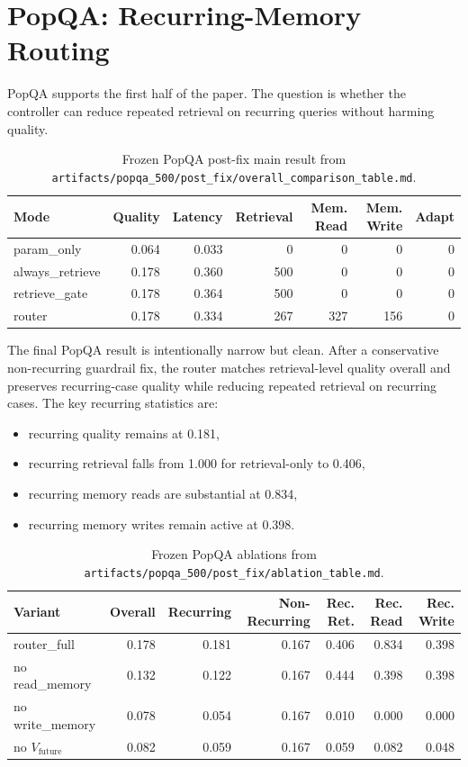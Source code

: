 \section{PopQA: Recurring-Memory Routing}

PopQA supports the first half of the paper. The question is whether the controller can reduce repeated retrieval on recurring queries without harming quality.

\begin{table}[t]
\centering
\small
\begin{tabular}{lrrrrrr}
\toprule
Mode & Quality & Latency & Retrieval & Mem. Read & Mem. Write & Adapt \\
\midrule
param\_only & 0.064 & 0.033 & 0 & 0 & 0 & 0 \\
always\_retrieve & 0.178 & 0.360 & 500 & 0 & 0 & 0 \\
retrieve\_gate & 0.178 & 0.364 & 500 & 0 & 0 & 0 \\
router & 0.178 & 0.334 & 267 & 327 & 156 & 0 \\
\bottomrule
\end{tabular}
\caption{Frozen PopQA post-fix main result from \texttt{artifacts/popqa\_500/post\_fix/overall\_comparison\_table.md}.}
\end{table}

The final PopQA result is intentionally narrow but clean. After a conservative non-recurring guardrail fix, the router matches retrieval-level quality overall and preserves recurring-case quality while reducing repeated retrieval on recurring cases. The key recurring statistics are:
\begin{itemize}[leftmargin=1.5em]
\item recurring quality remains at 0.181,
\item recurring retrieval falls from 1.000 for retrieval-only to 0.406,
\item recurring memory reads are substantial at 0.834,
\item recurring memory writes remain active at 0.398.
\end{itemize}

\begin{table}[t]
\centering
\small
\begin{tabular}{lrrrrrr}
\toprule
Variant & Overall & Recurring & Non-Recurring & Rec. Ret. & Rec. Read & Rec. Write \\
\midrule
router\_full & 0.178 & 0.181 & 0.167 & 0.406 & 0.834 & 0.398 \\
no read\_memory & 0.132 & 0.122 & 0.167 & 0.444 & 0.398 & 0.398 \\
no write\_memory & 0.078 & 0.054 & 0.167 & 0.010 & 0.000 & 0.000 \\
no $V_{\text{future}}$ & 0.082 & 0.059 & 0.167 & 0.059 & 0.082 & 0.048 \\
\bottomrule
\end{tabular}
\caption{Frozen PopQA ablations from \texttt{artifacts/popqa\_500/post\_fix/ablation\_table.md}.}
\end{table}

